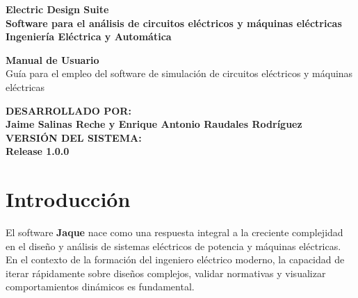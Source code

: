 \documentclass[11pt,a4paper]{article}
\begin{document}
\begin{titlepage}
    \vspace*{2.0cm}
    
    \noindent\hspace{1.2cm}%
    \begin{minipage}{\dimexpr\textwidth-1.5cm\relax}
        \vspace{0.5cm}
        {\fontsize{38}{44}\selectfont \textcolor{sedark}{\textbf{Electric Design Suite}}}\\[0.8em]
        {\fontsize{16}{20}\selectfont \textcolor{segreen}{\textbf{Software para el análisis de circuitos eléctricos y máquinas eléctricas}}}\\[0.5em]
        {\fontsize{12}{15}\selectfont \textcolor{textlight}{\textbf{Ingeniería Eléctrica y Automática}}}
        
        \vspace{3.5cm}
        
        {\fontsize{24}{28}\selectfont \textbf{\textcolor{sedark}{Manual de Usuario}}}\\[0.6em]
        {\fontsize{12}{18}\selectfont \textcolor{textlight}{Guía para el empleo del software de simulación de circuitos eléctricos y máquinas eléctricas}}
        
        \vspace{4.0cm}
        
        {\fontsize{9}{11}\selectfont \textcolor{textlight}{\textbf{DESARROLLADO POR:}}}\\[0.3em]
        {\fontsize{12}{14}\selectfont \textcolor{sedark}{\textbf{Jaime Salinas Reche y Enrique Antonio Raudales Rodríguez}}}\\[1.8em]
        {\fontsize{9}{11}\selectfont \textcolor{textlight}{\textbf{VERSIÓN DEL SISTEMA:}}}\\[0.3em]
        {\fontsize{12}{14}\selectfont \textcolor{sedark}{\textbf{Release 1.0.0}}}
    \end{minipage}
\end{titlepage}

\newpage
{\color{textmain}
\tableofcontents
}
\newpage


\section{Introducción}
El software \textbf{Jaque} nace como una respuesta integral a la creciente complejidad en el diseño y análisis de sistemas eléctricos de potencia y máquinas eléctricas. En el contexto de la formación del ingeniero eléctrico moderno, la capacidad de iterar rápidamente sobre diseños complejos, validar normativas y visualizar comportamientos dinámicos es fundamental. 
\end{document}
